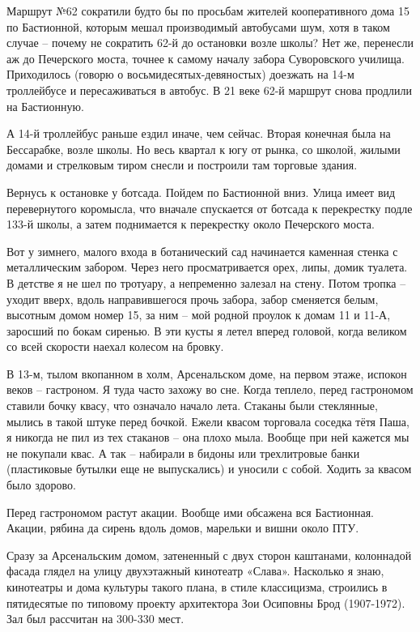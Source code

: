 Маршрут №62 сократили будто бы по просьбам жителей кооперативного дома 15 по Бастионной, которым мешал производимый автобусами шум, хотя в таком случае – почему не сократить 62-й до остановки возле школы? Нет же, перенесли аж до Печерского моста, точнее к самому началу забора Суворовского училища. Приходилось (говорю о восьмидесятых-девяностых) доезжать на 14-м троллейбусе и пересаживаться в автобус. В 21 веке 62-й маршрут снова продлили на Бастионную.

А 14-й троллейбус раньше ездил иначе, чем сейчас. Вторая конечная была на Бессарабке, возле школы. Но весь квартал к югу от рынка, со школой, жилыми домами и стрелковым тиром снесли и построили там торговые здания.

Вернусь к остановке у ботсада. Пойдем по Бастионной вниз. Улица имеет вид перевернутого коромысла, что вначале спускается от ботсада к перекрестку подле 133-й школы, а затем поднимается к перекрестку около Печерского моста.

Вот у зимнего, малого входа в ботанический сад начинается каменная стенка с металлическим забором. Через него просматривается орех, липы, домик туалета. В детстве я не шел по тротуару, а непременно залезал на стену. Потом тропка – уходит вверх, вдоль направившегося прочь забора, забор сменяется белым, высотным домом номер 15, за ним – мой родной проулок к домам 11 и 11-А, заросший по бокам сиренью. В эти кусты я летел вперед головой, когда великом со всей скорости наехал колесом на бровку.

В 13-м, тылом вкопанном в холм, Арсенальском доме, на первом этаже, испокон веков – гастроном. Я туда часто захожу во сне. Когда теплело, перед гастрономом ставили бочку квасу, что означало начало лета. Стаканы были стеклянные, мылись в такой штуке перед бочкой. Ежели квасом торговала соседка тётя Паша, я никогда не пил из тех стаканов – она плохо мыла. Вообще при ней кажется мы не покупали квас. А так – набирали в бидоны или трехлитровые банки (пластиковые бутылки еще не выпускались) и уносили с собой. Ходить за квасом было здорово.

Перед гастрономом растут акации. Вообще ими обсажена вся Бастионная. Акации, рябина да сирень вдоль домов, марельки и вишни около ПТУ.

Сразу за Арсенальским домом, затененный с двух сторон каштанами, колоннадой фасада глядел на улицу двухэтажный кинотеатр «Слава». Насколько я знаю, кинотеатры и дома культуры такого плана, в стиле классицизма, строились в пятидесятые по типовому проекту архитектора Зои Осиповны Брод (1907-1972). Зал был рассчитан на 300-330 мест. 

